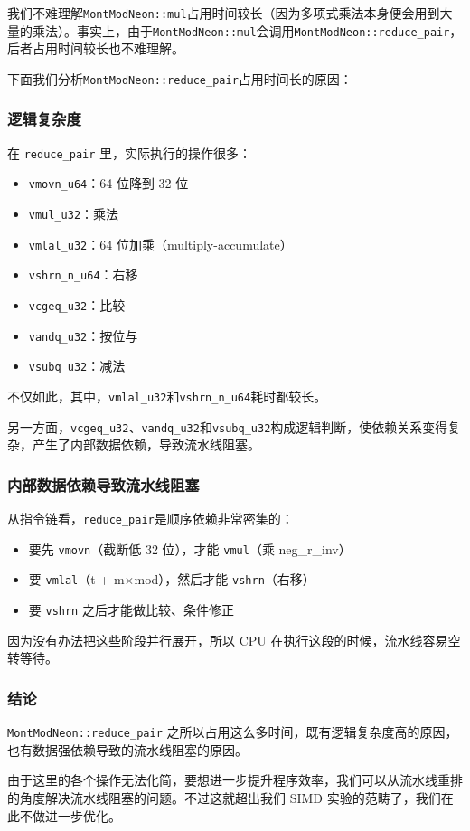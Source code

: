 \documentclass[a4paper]{article}
\begin{document}
我们不难理解\texttt{MontModNeon::mul}占用时间较长（因为多项式乘法本身便会用到大量的乘法）。事实上，由于\texttt{MontModNeon::mul}会调用\texttt{MontModNeon::reduce\_pair}，后者占用时间较长也不难理解。

下面我们分析\texttt{MontModNeon::reduce\_pair}占用时间长的原因：

\subsubsection{逻辑复杂度}

在 \texttt{reduce\_pair} 里，实际执行的操作很多：

\begin{itemize}
    \item \texttt{vmovn\_u64}：64 位降到 32 位
    \item \texttt{vmul\_u32}：乘法
    \item \texttt{vmlal\_u32}：64 位加乘（multiply-accumulate）
    \item \texttt{vshrn\_n\_u64}：右移
    \item \texttt{vcgeq\_u32}：比较
    \item \texttt{vandq\_u32}：按位与
    \item \texttt{vsubq\_u32}：减法
\end{itemize}

不仅如此，其中，\texttt{vmlal\_u32}和\texttt{vshrn\_n\_u64}耗时都较长。

另一方面，\texttt{vcgeq\_u32}、\texttt{vandq\_u32}和\texttt{vsubq\_u32}构成逻辑判断，使依赖关系变得复杂，产生了内部数据依赖，导致流水线阻塞。

\subsubsection{内部数据依赖导致流水线阻塞}

从指令链看，\texttt{reduce\_pair}是顺序依赖非常密集的：

\begin{itemize}
    \item 要先 \texttt{vmovn}（截断低 32 位），才能 \texttt{vmul}（乘 neg\_r\_inv）
    \item 要 \texttt{vmlal}（t + m$\times$mod），然后才能 \texttt{vshrn}（右移）
    \item 要 \texttt{vshrn} 之后才能做比较、条件修正
\end{itemize}

因为没有办法把这些阶段并行展开，所以 CPU 在执行这段的时候，流水线容易空转等待。

\subsubsection{结论}

\texttt{MontModNeon::reduce\_pair} 之所以占用这么多时间，既有逻辑复杂度高的原因，也有数据强依赖导致的流水线阻塞的原因。

由于这里的各个操作无法化简，要想进一步提升程序效率，我们可以从流水线重排的角度解决流水线阻塞的问题。不过这就超出我们 SIMD 实验的范畴了，我们在此不做进一步优化。
\end{document}
